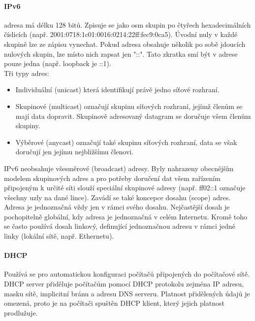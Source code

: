 \documentclass[10pt,a4paper]{article}
\begin{document}
\paragraph{IPv6} adresa má délku 128 bitů. Zpisuje se jako osm skupin po čtyřech hexadecimálních číslicích (např. 2001:0718:1c01:0016:0214:22ff:fec9:0ca5). Úvodní nuly v každé skupině lze ze zápisu vynechat. Pokud adresa obsahuje několik po sobě jdoucích nulových skupin, lze místo nich zapsat jen "::". Tato zkratka smí být v adrese pouze jedna (např. loopback je ::1).\\
Tři typy adres:
\begin{itemize}
	\item Individuální (unicast) která identifikují právě jedno síťové rozhraní.
	\item Skupinové (multicast) označují skupinu síťových rozhraní, jejímž členům se mají data dopravit. Skupinově adresovaný datagram se doručuje všem členům skupiny.
	\item Výběrové (anycast) označují také skupinu síťových rozhraní, data se však doručují jen jejímu nejbližšímu členovi.
\end{itemize}
IPv6 neobsahuje všesměrové (broadcast) adresy. Byly nahrazeny obecnějším modelem skupinových adres a pro potřeby doručení dat všem zařízením připojeným k určité síti slouží speciální skupinové adresy (např. ff02::1 označuje všechny uzly na dané lince). Zavádí se také koncepce dosahu (scope) adres. Adresa je jednoznačná vždy jen v rámci svého dosahu. Nejčastější dosah je pochopitelně globální, kdy adresa je jednoznačná v celém Internetu. Kromě toho se často používá dosah linkový, definující jednoznačnou adresu v rámci jedné linky (lokální sítě, např. Ethernetu).
\paragraph{DHCP} Používá se pro automatickou konfiguraci počítačů připojených do počítačové sítě. DHCP server přiděluje počítačům pomocí DHCP protokolu zejména IP adresu, masku sítě, implicitní bránu a adresu DNS serveru. Platnost přidělených údajů je omezená, proto je na počítači spuštěn DHCP klient, který jejich platnost prodlužuje.
\end{document}
